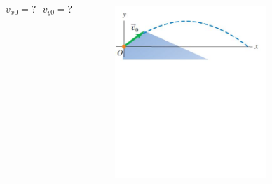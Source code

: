 \documentclass[]{beamer}
\begin{document}
\begin{frame}
   
  



    \begin{columns}[c]
        \column{2.3in}  %
       
        \begin{equation*}
            v_{x0}=? \ \ \  v_{y0}=?
          \end{equation*}
          
        
      
      

        \column{2.5in}
        
  
        \begin{figure}[h!]  
            \includegraphics[width=0.7\textwidth]{images/20_0.jpg}
         
          \end{figure}
           
     
        \end{columns}



  
  \end{frame}
  
\end{document}
